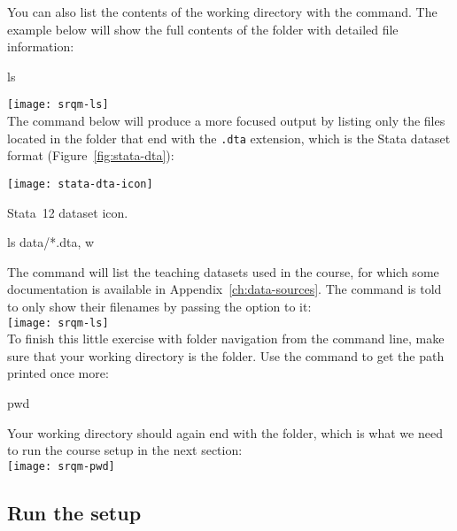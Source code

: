 	You can also list the contents of the working directory with the  command. The example below will show the full contents of the \SRQM folder with detailed file information:%
	
		\begin{docspec}
			ls
		\end{docspec}

		\texttt{[image: srqm-ls]}\\[1em]
			
	The  command below will produce a more focused output by listing only the files located in the \data folder that end with the \texttt{.dta} extension, which is the Stata dataset format (Figure~\ref{fig:stata-dta}):%

		\begin{marginfigure}
			\texttt{[image: stata-dta-icon]}
			\caption{Stata~12 dataset icon.}
			\label{fig:stata-dta}
		\end{marginfigure}

		\begin{docspec}
			ls data/*.dta, w
		\end{docspec}
			 
	The command will list the teaching datasets used in the course, for which some documentation is available in Appendix~\ref{ch:data-sources}. The  command is told to only show their filenames by passing the  option to it:\\[1em]%
 
		\texttt{[image: srqm-ls]}\\[1em]
	
	To finish this little exercise with folder navigation from the command line, make sure that your working directory is the \SRQM folder. Use the  command to get the path printed once more:%
	
		\begin{docspec}
			pwd
		\end{docspec}
	
	Your working directory should again end with the \SRQM folder, which is what we need to run the course setup in the next section:\\[1em]%
	
		\texttt{[image: srqm-pwd]}\\[1em]
  
  \subsection{Run the \SRQM setup}%
		\label{sec:setup}%

